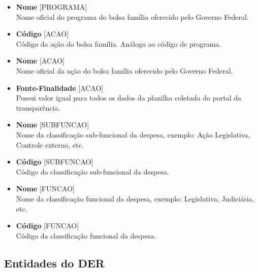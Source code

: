 \documentclass[12pt]{article}
\begin{document}
\begin{itemize}
		\item \textbf{Nome} [PROGRAMA] \\ Nome oficial do programa do bolsa família oferecido pelo Governo Federal.
		\item \textbf{Código} [ACAO] \\ Código da ação do bolsa família. Análogo ao código de programa. 
		\item \textbf{Nome} [ACAO] \\ Nome oficial da ação do bolsa família oferecido pelo Governo Federal.
		\item \textbf{Fonte-Finalidade} [ACAO] \\ Possui valor igual para todos os dados da planilha coletada do portal da transparência.
		\item \textbf{Nome} [SUBFUNCAO] \\ Nome da classificação sub-funcional da despesa, exemplo: Ação Legislativa, Controle externo, etc.
		\item \textbf{Código} [SUBFUNCAO] \\ Código da classificação sub-funcional da despesa.
		\item \textbf{Nome} [FUNCAO] \\ Nome da classificação funcional da despesa, exemplo: Legislativa, Judiciária, etc.
		\item \textbf{Código} [FUNCAO] \\ Código da classificação funcional da despesa.
	\end{itemize}
	
	\subsection{Entidades do DER}
	\label{sec:ent}
	
\end{document}
